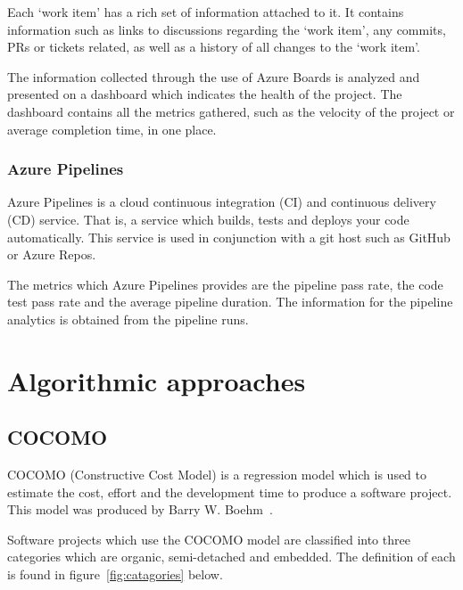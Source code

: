 \documentclass{article}
\begin{document}
Each `work item' has a rich set of information attached to it. It contains
information such as links to discussions regarding the `work item', any
commits, PRs or tickets related, as well as a history of all changes to the
`work item'.

The information collected through the use of Azure Boards is analyzed and
presented on a dashboard which indicates the health of the project. The
dashboard contains all the metrics gathered, such as the velocity of the
project or average completion time, in one place.~\cite{azure2020boards}

\subsubsection{Azure Pipelines}
Azure Pipelines is a cloud continuous integration (CI) and continuous delivery
(CD) service. That is, a service which builds, tests and deploys your code
automatically. This service is used in conjunction with a git host such as
GitHub or Azure Repos.

The metrics which Azure Pipelines provides are the pipeline pass rate, the code
test pass rate and the average pipeline duration. The information for the
pipeline analytics is obtained from the pipeline runs.

\section{Algorithmic approaches}

\subsection{COCOMO}
COCOMO (Constructive Cost Model) is a regression model which is used to
estimate the cost, effort and the development time to produce a software
project. This model was produced by Barry W. Boehm~\cite{barry1981software}.

Software projects which use the COCOMO model are classified into three
categories which are organic, semi-detached and embedded. The definition of
each is found in figure~\ref{fig:catagories} below.
\end{document}

